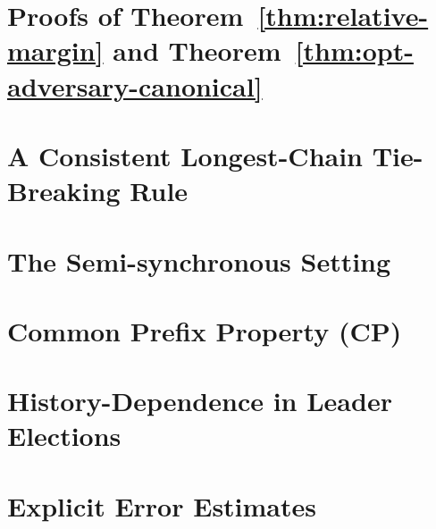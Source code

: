 \chapter{Proofs of Theorem~\ref{thm:relative-margin} and Theorem~\ref{thm:opt-adversary-canonical}}\label{sec:margin-proof-multihonest}



\chapter{A Consistent Longest-Chain Tie-Breaking Rule}\label{sec:lcr-tie-multihonest}\label{sec:lcr-model}



\chapter{The Semi-synchronous Setting}\label{sec:async-multihonest}\label{sec:async-model-multihonest}



\chapter{Common Prefix Property (CP)}\label{sec:cp-multihonest}\label{sec:cp-model-multihonest}



\chapter{History-Dependence in Leader Elections}\label{sec:martingale}



\chapter{Explicit Error Estimates}\label{sec:exact-prob-multihonest}


